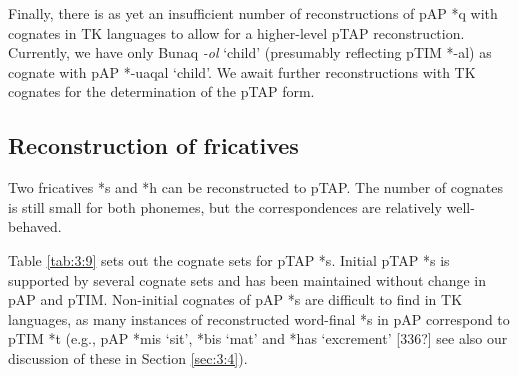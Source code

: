 \documentclass[output=paper]{LSP/langsci}
\begin{document}
Finally, there is as yet an insufficient number of reconstructions of pAP *q with cognates in TK languages to allow for a higher-level pTAP reconstruction. Currently, we have only Bunaq \textit{{}-ol} `child' (presumably reflecting pTIM *-al) as cognate with pAP *-uaqal `child'. We await further reconstructions with TK cognates for the determination of the pTAP form.

\subsection{Reconstruction of fricatives}
Two fricatives *s and *h can be reconstructed to pTAP. The number of cognates is still small for both phonemes, but the correspondences are relatively well-behaved. 

Table \ref{tab:3:9} sets out the cognate sets for pTAP *s. Initial pTAP *s is supported by several cognate sets and has been maintained without change in pAP and pTIM. Non-initial cognates of pAP *s are difficult to find in TK languages, as many instances of reconstructed word-final *s in pAP correspond to pTIM *t (e.g., pAP *mis `sit', *bis `mat' and *has `excrement'  [336?]  see also our discussion of these in Section \ref{sec:3:4}).

 
\end{document}
